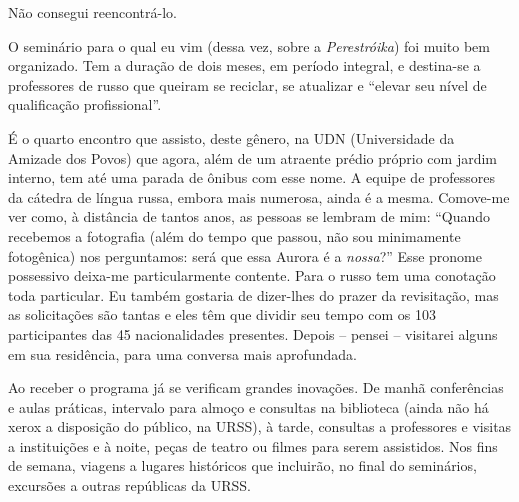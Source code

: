 Não consegui reencontrá-lo.

O seminário para o qual eu vim (dessa vez, sobre a \emph{Perestróika})
foi muito bem organizado. Tem a duração de dois meses, em período
integral, e destina-se a professores de russo que queiram se reciclar,
se atualizar e ``elevar seu nível de qualificação profissional''.

É o quarto encontro que assisto, deste gênero, na UDN (Universidade da
Amizade dos Povos) que agora, além de um atraente prédio próprio com
jardim interno, tem até uma parada de ônibus com esse nome. A equipe de
professores da cátedra de língua russa, embora mais numerosa, ainda é a
mesma. Comove-me ver como, à distância de tantos anos, as pessoas se
lembram de mim: ``Quando recebemos a fotografia (além do tempo que
passou, não sou minimamente fotogênica) nos perguntamos: será que essa
Aurora é a \emph{nossa}?'' Esse pronome possessivo deixa-me
particularmente contente. Para o russo tem uma conotação toda
particular. Eu também gostaria de dizer-lhes do prazer da revisitação,
mas as solicitações são tantas e eles têm que dividir seu tempo com os
103 participantes das 45 nacionalidades presentes. Depois -- pensei --
visitarei alguns em sua residência, para uma conversa mais aprofundada.

Ao receber o programa já se verificam grandes inovações. De manhã
conferências e aulas práticas, intervalo para almoço e consultas na
biblioteca (ainda não há xerox a disposição do público, na URSS), à
tarde, consultas a professores e visitas a instituições e à noite, peças
de teatro ou filmes para serem assistidos. Nos fins de semana, viagens a
lugares históricos que incluirão, no final do seminários, excursões a
outras repúblicas da URSS.

